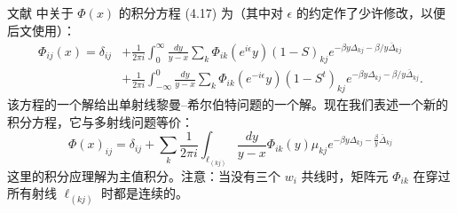 文献 \cite{Cecotti:1993rm} 中关于 $\Phi(x)$ 的积分方程 (4.17) 为（其中对 $\epsilon$ 的约定作了少许修改，以便后文使用）：
\begin{align}
\Phi_{ij}(x) = \delta_{ij} &+ \frac{1}{2 \pi i} \int_0^\infty
\frac{dy}{y-x} \sum_k \Phi_{ik}(e^{i \epsilon} y)(1-S)_{kj}e^{-
\beta y \Delta_{kj} - \beta/y \bar \Delta_{kj}}  \nonumber  \\
&+ \frac{1}{2 \pi i}
\int_{-\infty}^0 \frac{dy}{y-x} \sum_k \Phi_{ik}(e^{-i \epsilon}
y)(1-S^t)_{kj}e^{- \beta y \Delta_{kj} - \beta/y \bar \Delta_{kj}}. \label{eq:cv-integral}
\end{align}
该方程的一个解给出单射线黎曼--希尔伯特问题的一个解。现在我们表述一个新的积分方程，它与多射线问题等价：
\begin{equation} \label{eq:cv-multi-line}
\Phi(x)_{ij} = \delta_{ij} + \sum_{k} \frac{1}{2 \pi i}
\int_{\ell_{(kj)}} \frac{dy}{y-x}\Phi_{ik}(y)\mu_{kj}e^{- \beta y
\Delta_{kj} - \frac{\beta}{y} \bar \Delta_{kj}}
\end{equation}
这里的积分应理解为主值积分。注意：当没有三个 $w_i$ 共线时，矩阵元 $\Phi_{ik}$ 在穿过所有射线 $\ell_{(kj)}$ 时都是连续的。

